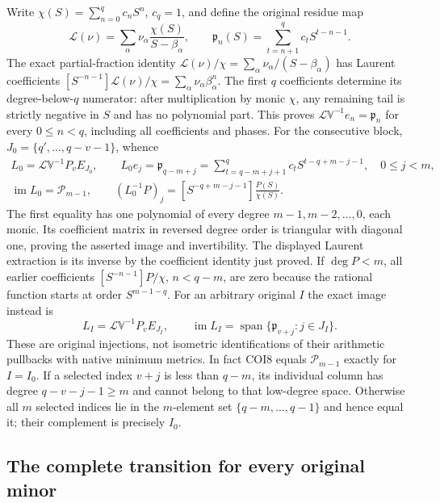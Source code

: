 Write $\chi(S)=\sum_{n=0}^{q}c_nS^n$, $c_q=1$, and define the
original residue map
\[
 \mathcal L(\nu)=\sum_\alpha\nu_\alpha\frac{\chi(S)}{S-\beta_\alpha},
 \qquad
 \mathfrak p_n(S)=\sum_{t=n+1}^{q}c_tS^{t-n-1}.
 \tag{COI6}
\]
The exact partial-fraction identity
$\mathcal L(\nu)/\chi=\sum_\alpha\nu_\alpha/(S-\beta_\alpha)$
has Laurent coefficients
$[S^{-n-1}]\mathcal L(\nu)/\chi=\sum_\alpha\nu_\alpha\beta_\alpha^n$.
The first $q$ coefficients determine its degree-below-$q$ numerator:
after multiplication by monic $\chi$, any remaining tail is strictly
negative in $S$ and has no polynomial part. This proves
$\mathcal L\mathbb V^{-1}e_n=\mathfrak p_n$ for every $0\le n<q$,
including all coefficients and phases.
For the consecutive block, $J_0=\{q',\ldots,q-v-1\}$, whence
\[
 \begin{gathered}
 L_0=\mathcal L\mathbb V^{-1}P_vE_{J_0},\qquad
 L_0e_j=\mathfrak p_{q-m+j}
       =\sum_{t=q-m+j+1}^{q}c_tS^{t-q+m-j-1},\quad0\le j<m,\\
 \operatorname{im}L_0=\mathcal P_{m-1},\qquad
 (L_0^{-1}P)_j=[S^{-q+m-j-1}]\frac{P(S)}{\chi(S)}.
 \end{gathered}                                                   \tag{COI7}
\]
The first equality has one polynomial of every degree
$m-1,m-2,\ldots,0$, each monic. Its coefficient matrix in reversed
degree order is triangular with diagonal one, proving the asserted
image and invertibility. The displayed Laurent extraction is its
inverse by the coefficient identity just proved. If $\deg P<m$,
all earlier coefficients $[S^{-n-1}]P/\chi$, $n<q-m$, are zero
because the rational function starts at order $S^{m-1-q}$.
For an arbitrary original $I$ the exact image instead is
\[
 L_I=\mathcal L\mathbb V^{-1}P_vE_{J_I},\qquad
 \operatorname{im}L_I
       =\operatorname{span}\{\mathfrak p_{v+j}:j\in J_I\}.
 \tag{COI8}
\]
These are original injections, not isometric identifications of
their arithmetic pullbacks with native minimum metrics.
In fact COI8 equals $\mathcal P_{m-1}$ exactly for $I=I_0$.
If a selected index $v+j$ is less than $q-m$, its individual
column has degree $q-v-j-1\ge m$ and cannot belong to that
low-degree space. Otherwise all $m$ selected indices lie in
the $m$-element set $\{q-m,\ldots,q-1\}$ and hence equal it;
their complement is precisely $I_0$.

\subsection{The complete transition for every original minor}

